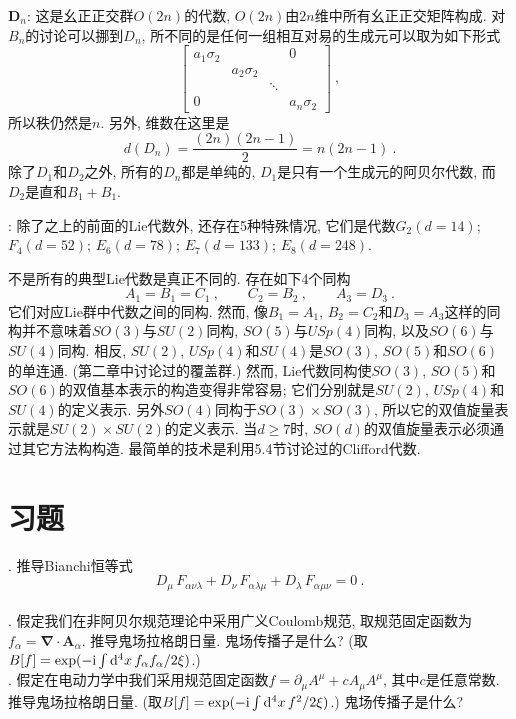 \noindent $\bm{D}_{n}$: 这是幺正正交群$O(2n)$的代数, $O(2n)$由$2n$维中所有幺正正交矩阵构成. 
对$B_{n}$的讨论可以挪到$D_{n}$, 所不同的是任何一组相互对易的生成元可以取为如下形式
\[
    \begin{bmatrix}
        a_{1}\sigma _{2} &  &  & 0 \\
        & a_{2}\sigma _{2} &  &  \\
        &  & \ddots  &  \\
        0 &  &  & a_{n}\sigma _{2}%
    \end{bmatrix} \:,
\]%
所以秩仍然是$n$. 另外,
维数在这里是\[
d(D_{n})=\frac{(2n)(2n-1)}{2}=n(2n-1)\:. 
\]%
除了$D_{1}$和$D_{2}$之外, 所有的$D_{n}$都是单纯的, $D_{1}$是只有一个生成元的阿贝尔代数, 而$D_{2}$是直和$%
B_{1}+B_{1}$.

: 除了之上的前面的Lie代数外, 还存在5种特殊情况, 它们是代数$G_{2}(d=14)$; $F_{4}(d=52)$; %
$E_{6}(d=78)$; $E_{7}(d=133)$; $E_{8}(d=248)$.

不是所有的典型Lie代数是真正不同的. 存在如下4个同构
\[
A_{1}=B_{1}=C_{1} \:, \qquad C_{2}=B_{2} \:, \qquad  A_{3}=D_{3}\:. 
\]%
它们对应Lie群中代数之间的同构. 然而, 像$B_{1}=A_{1}$, $B_{2}=C_{2}$和$D_{3}=A_{3}$这样的同构并不意味着$SO(3)$与$SU(2)$同构, 
$SO(5)$与$USp(4)$同构, 以及$SO(6)$与$SU(4)$同构. 相反, $SU(2)$, $USp(4)$和$SU(4)$是$SO(3)$, 
$SO(5)$和$SO(6)$的单连通{}. (第二章中讨论过的覆盖群.) 然而, Lie代数同构使$SO(3)$, 
$SO(5)$和$SO(6)$的双值基本表示的构造变得非常容易; 它们分别就是$SU(2)$, $USp(4)$和$SU(4)$的定义表示.
另外$SO(4)$同构于$SO(3)\times SO(3)$, 所以它的双值旋量表示就是$SU(2)\times SU(2)$的定义表示.
当$d\geq 7$时, $SO(d)$的双值旋量表示必须通过其它方法构构造. 最简单的技术是利用5.4节讨论过的Clifford代数.

\section*{习题}
. 推导Bianchi恒等式
\[
D_{\mu}\,F_{\alpha\nu\lambda}+D_{\nu}\,F_{\alpha \lambda\mu}+D_{\lambda}\,F_{\alpha\mu\nu}=0 \:. 
\]
\\

. 假定我们在非阿贝尔规范理论中采用广义Coulomb规范, 取规范固定函数为$f_{\alpha }=\bm{\nabla} \cdot \bm{A}_{\alpha }$. 
推导鬼场拉格朗日量. 鬼场传播子是什么? (取$B[f]=\exp (-\mathrm{i}\int \mathrm{d}^{4}x\,f_{\alpha }f_{\alpha }/2\xi )$.)\\

. 假定在电动力学中我们采用规范固定函数$f=\partial _{\mu }A^{\mu }+cA_{\mu }A^{\mu }$, 其中$c$是任意常数. 
推导鬼场拉格朗日量. (取$B[f]=\exp (-\mathrm{i}\int \mathrm{d}^{4}x\,f^{2}/2\xi )$.) 鬼场传播子是什么?\\

